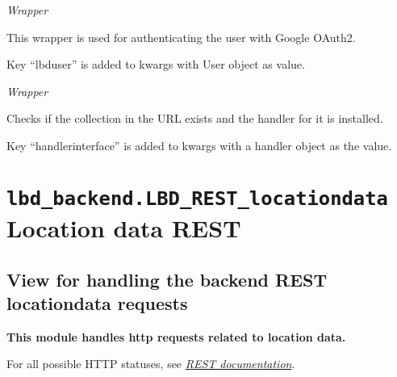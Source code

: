 \documentclass[letterpaper,10pt,english]{sphinxmanual}
\begin{document}
\begin{fulllineitems}
\label{codedoc/decdoc:lbd_backend.LBD_REST_locationdata.decorators.lbd_require_login}
\emph{Wrapper}

This wrapper is used for authenticating the user with Google OAuth2.

Key ``lbduser'' is added to kwargs with User object as value.

\end{fulllineitems}


\begin{fulllineitems}
\label{codedoc/decdoc:lbd_backend.LBD_REST_locationdata.decorators.location_collection}
\emph{Wrapper}

Checks if the collection in the URL exists and the handler for it is installed.

Key ``handlerinterface'' is added to kwargs with a handler object as the value.

\end{fulllineitems}



\section{\texttt{lbd\_backend.LBD\_REST\_locationdata} Location data REST}
\label{codedoc/locdoc:lbd-backend-lbd-rest-locationdata-location-data-rest}\label{codedoc/locdoc::doc}\label{codedoc/locdoc:module-lbd_backend.LBD_REST_locationdata.views}

\subsection{View for handling the backend REST locationdata requests}
\label{codedoc/locdoc:view-for-handling-the-backend-rest-locationdata-requests}\label{codedoc/locdoc:module-LocationdataREST.views}
\textbf{This module handles http requests related to location data.}

For all possible HTTP statuses, see {\hyperref[restdoc:restdoc]{\emph{REST documentation}}}.
\end{document}
